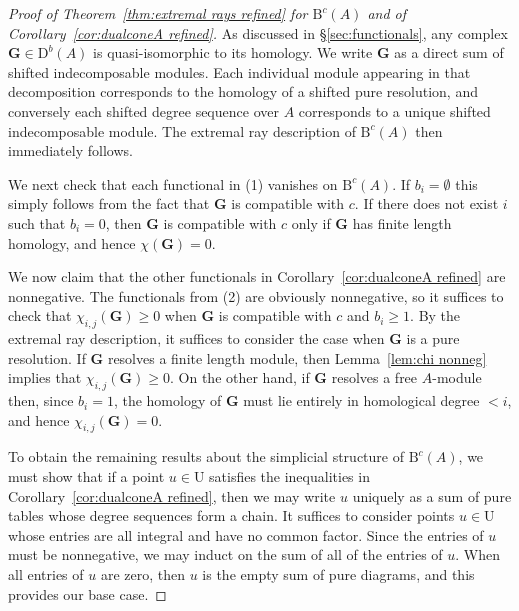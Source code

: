 \documentclass[12pt]{amsart}
\theoremstyle{definition}
\theoremstyle{remark}
\newcommand{\UU}{\mathrm{U}}
\newcommand{\cc}{c}
\newcommand{\Gbull}{\mathbf{G}}
\newcommand{\nothing}{\emptyset}
\newcommand{\DD}{\mathrm{D}}
\newcommand{\BBQ}{\mathrm{B}}
\begin{document}
\begin{proof}[Proof of Theorem~\ref{thm:extremal rays refined} for $\BBQ^{\cc}(A)$ and of Corollary~\ref{cor:dualconeA refined}]
As discussed in \S\ref{sec:functionals}, any complex $\Gbull\in \DD^b(A)$ is quasi-isomorphic to its homology.  We write $\Gbull$ as a direct sum of shifted indecomposable modules.  Each individual module appearing in that decomposition corresponds to the homology of a shifted pure resolution, and conversely each shifted degree sequence over $A$ corresponds to a unique shifted indecomposable module.  The extremal ray description of $\BBQ^{\cc}(A)$ then immediately follows.

We next check that each functional in (1) vanishes on $\BBQ^{\cc}(A)$.  If $b_i=\nothing$ this simply follows from the fact that $\Gbull$ is compatible with $\cc$.  If there does not exist $i$ such that $b_i=0$, then $\Gbull$ is compatible with $\cc$ only if $\Gbull$ has finite length homology, and hence $\chi(\Gbull)=0$.  

We now claim that the other functionals in Corollary~\ref{cor:dualconeA refined} are nonnegative.  The functionals from (2) are obviously nonnegative, so it suffices to check that $\chi_{i,j}(\Gbull)\geq 0$ when $\Gbull$ is compatible with $\cc$ and $b_i\geq 1$.  By the extremal ray description, it suffices to consider the case when $\Gbull$ is a pure resolution.  If $\Gbull$ resolves a finite length module, then Lemma~\ref{lem:chi nonneg} implies that $\chi_{i,j}(\Gbull)\geq 0$.  On the other hand, if $\Gbull$ resolves a free $A$-module then, since $b_i=1$, the homology of $\Gbull$ must lie entirely in homological degree $<i$, and hence $\chi_{i,j}(\Gbull)=0$.

To obtain the remaining results about the simplicial structure of $\BBQ^{\cc}(A)$, we must show that if a point $u\in \UU$ satisfies the inequalities in Corollary~\ref{cor:dualconeA refined}, then we may write $u$ uniquely as a sum of pure tables whose degree sequences form a chain.  It suffices to consider points $u\in \UU$ whose entries are all integral and have no common factor.  Since the entries of $u$ must be nonnegative, we may induct on the sum of all of the entries of $u$.  When all entries of $u$ are zero, then $u$ is the empty sum of pure diagrams, and this provides our base case.


\end{proof}
\end{document}
